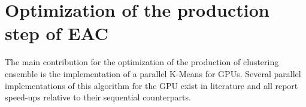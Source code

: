 

\section{Optimization of the production step of EAC}
\label{sec:imple}

The main contribution for the optimization of the production of clustering ensemble is the implementation of a parallel K-Means for GPUs.
Several parallel implementations of this algorithm for the GPU exist in literature \cite{Bai2009, Zechner2009, Sirotkovi2012} and all report speed-ups relative to their sequential counterparts.

